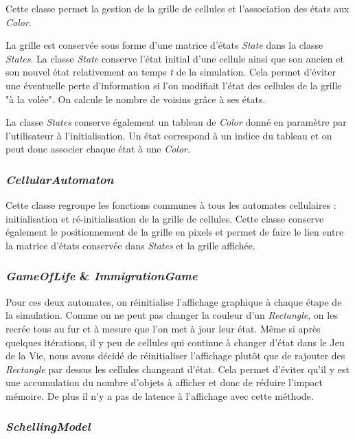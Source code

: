 \documentclass[a4paper, 11pt]{article}
\begin{document}
Cette classe permet la gestion de la grille de cellules et l'association des états aux \textit{Color}.

La grille est conservée sous forme d'une matrice d'états \textit{State} dans la classe \textit{States}. La classe \textit{State} conserve l'état initial d'une cellule ainsi que son ancien et son nouvel état relativement au temps \textit{t} de la simulation. Cela permet d'éviter une éventuelle perte d'information si l'on modifiait l'état des cellules de la grille "à la volée". On calcule le nombre de voisins grâce à ses états.

La classe \textit{States} conserve également un tableau de \textit{Color} donné en paramètre par l'utilisateur à l'initialisation. Un état correspond à un indice du tableau et on peut donc associer chaque état à une \textit{Color}.

\subsubsection*{\textit{CellularAutomaton}}

Cette classe regroupe les fonctions communes à tous les automates cellulaires : initialisation et ré-initialisation de la grille de cellules. Cette classe conserve également le positionnement de la grille en pixels et permet de faire le lien entre la matrice d'états conservée dans \textit{States} et la grille affichée.

\subsubsection*{\textit{GameOfLife} \& \textit{ImmigrationGame}}

Pour ces deux automates, on réinitialise l'affichage graphique à chaque étape de la simulation. Comme on ne peut pas changer la couleur d'un \textit{Rectangle}, on les recrée tous au fur et à mesure que l'on met à jour leur état. Même si après quelques itérations, il y peu de cellules qui continue à changer d'état dans le Jeu de la Vie, nous avons décidé de réinitialiser l'affichage plutôt que de rajouter des \textit{Rectangle} par dessus les cellules changeant d'état. Cela permet d'éviter qu'il y est une accumulation du nombre d'objets à afficher et donc de réduire l'impact mémoire. De plus il n'y a pas de latence à l'affichage avec cette méthode.

\subsubsection*{\textit{SchellingModel}}
\end{document}
